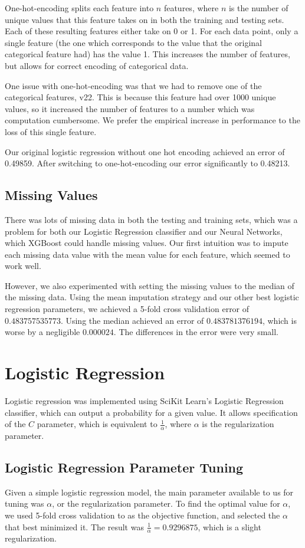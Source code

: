 \documentclass[twoside,11pt]{article}
\theoremstyle{definition}
\begin{document}
    One-hot-encoding splits each feature into $n$ features, where $n$ is the number of unique values that this feature takes on in both the training and testing sets. Each of these resulting features either take on 0 or 1. For each data point, only a single feature (the one which corresponds to the value that the original categorical feature had) has the value 1. This increases the number of features, but allows for correct encoding of categorical data.

    One issue with one-hot-encoding was that we had to remove one of the categorical features, v22. This is because this feature had over 1000 unique values, so it increased the number of features to a number which was computation cumbersome. We prefer the empirical increase in performance to the loss of this single feature.

    Our original logistic regression without one hot encoding achieved an error of 0.49859. After switching to one-hot-encoding our error significantly to 0.48213.
    
  \subsection{Missing Values}
    There was lots of missing data in both the testing and training sets, which was a problem for both our Logistic Regression classifier and our Neural Networks, which XGBoost could handle missing values. Our first intuition was to impute each missing data value with the mean value for each feature, which seemed to work well. 

    However, we also experimented with setting the missing values to the median of the missing data. Using the mean imputation strategy and our other best logistic regression parameters, we achieved a 5-fold cross validation error of $0.483757535773$. Using the median achieved an error of $0.483781376194$, which is worse by a negligible $0.000024$. The differences in the error were very small.

\section{Logistic Regression}
  Logistic regression was implemented using SciKit Learn's Logistic Regression classifier, which can output a probability for a given value. It allows specification of the $C$ parameter, which is equivalent to $\frac{1}{\alpha}$, where $\alpha$ is the regularization parameter.

  \subsection{Logistic Regression Parameter Tuning}
  Given a simple logistic regression model, the main parameter available to us for tuning was $\alpha$, or the regularization parameter. To find the optimal value for $\alpha$, we used 5-fold cross validation to as the objective function, and selected the $\alpha$ that best minimized it. The result was $\frac{1}{\alpha} = 0.9296875$, which is a slight regularization.
\end{document}
